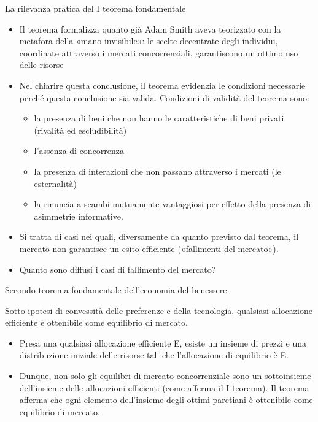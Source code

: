 \documentclass[aspectratio=64,11pt]{beamer}
\begin{document}
\begin{frame}{La rilevanza pratica del I teorema fondamentale}
\begin{itemize}
\item Il teorema formalizza quanto già Adam Smith aveva teorizzato con la metafora
della «mano invisibile»: le scelte decentrate degli individui, coordinate
attraverso i mercati concorrenziali, garantiscono un ottimo uso delle
risorse
\item Nel chiarire questa conclusione, il teorema evidenzia le condizioni
necessarie perché questa conclusione sia valida. Condizioni di validità del
teorema sono:
\begin{itemize}
\item la presenza di beni che non hanno le caratteristiche di beni privati
(rivalità ed escludibilità)
\item l’assenza di \alert{concorrenza}
\item la presenza di interazioni che non passano attraverso i mercati (le
\alert{esternalità})
\item la rinuncia a scambi mutuamente vantaggiosi per effetto della presenza di
\alert{asimmetrie informative}.
\end{itemize}
\item Si tratta di casi nei quali, diversamente da quanto previsto dal teorema, il
mercato non garantisce un esito efficiente («fallimenti del mercato»).
\item Quanto sono diffusi i casi di fallimento del mercato?
\end{itemize}
\end{frame}

\begin{frame}{Secondo teorema fondamentale dell'economia del benessere}
\begin{block}{}
Sotto ipotesi di convessità delle preferenze e della tecnologia, qualsiasi allocazione efficiente è ottenibile come equilibrio di mercato. 
\end{block}
\begin{itemize}
\item Presa una qualsiasi allocazione efficiente E, esiste un insieme di prezzi e
una distribuzione iniziale delle risorse tali che l’allocazione di
equilibrio è E.
\item Dunque, non solo gli equilibri di mercato concorrenziale sono un
sottoinsieme dell’insieme delle allocazioni efficienti (come afferma il I
teorema). Il teorema afferma che ogni elemento dell’insieme degli
ottimi paretiani è ottenibile come equilibrio di mercato.
\end{itemize}
\end{frame}
\end{document}
